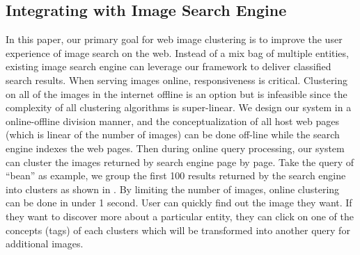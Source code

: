 \subsection{Integrating with Image Search Engine}
In this paper, our primary goal for web image clustering is to
improve the user experience of image search on the web.
Instead of a mix bag of multiple entities, existing image search engine
can leverage our framework to deliver classified search results.
When serving images online, responsiveness is critical.
Clustering on all of the images in the internet offline is an option
but is infeasible since the complexity of all clustering algorithms
is super-linear. We design our system in a online-offline division
manner, and the conceptualization of all host web pages (which is linear of the number of
images) can be done off-line while the search engine indexes the web pages.
Then during online query processing, our system can cluster the images
returned by search engine page by page. Take the query of ``bean'' as example,
we group the first 100 results returned by the search engine
into clusters as shown in .
By limiting the number of images, online clustering can
be done in under 1 second. User can quickly find out the image they want.
If they want to discover more about a particular entity,
they can click on one of the concepts (tags) of each clusters
which will be transformed into another query for additional images.
